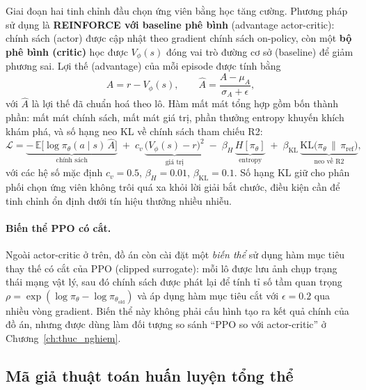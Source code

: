 \documentclass[../DoAn.tex]{subfiles}
\begin{document}
Giai đoạn hai tinh chỉnh đầu chọn ứng viên bằng học tăng cường. Phương pháp sử dụng là \textbf{REINFORCE với baseline phê bình} (advantage actor-critic): chính sách (actor) được cập nhật theo gradient chính sách on-policy, còn một \textbf{bộ phê bình (critic)} học được $V_\phi(s)$ đóng vai trò đường cơ sở (baseline) để giảm phương sai. Lợi thế (advantage) của mỗi episode được tính bằng
\begin{equation}
    A = r - V_\phi(s), \qquad \hat{A} = \frac{A - \mu_A}{\sigma_A + \epsilon},
    \label{eq:advantage}
\end{equation}
với $\hat{A}$ là lợi thế đã chuẩn hoá theo lô. Hàm mất mát tổng hợp gồm bốn thành phần: mất mát chính sách, mất mát giá trị, phần thưởng entropy khuyến khích khám phá, và số hạng neo KL về chính sách tham chiếu R2:
\begin{equation}
    \mathcal{L} = \underbrace{-\,\mathbb{E}\big[\log \pi_\theta(a\mid s)\,\hat{A}\big]}_{\text{chính sách}} \;+\; c_v\,\underbrace{\big(V_\phi(s) - r\big)^2}_{\text{giá trị}} \;-\; \beta_H\,\underbrace{H[\pi_\theta]}_{\text{entropy}} \;+\; \beta_{\text{KL}}\,\underbrace{\mathrm{KL}\big(\pi_\theta \,\|\, \pi_{\text{ref}}\big)}_{\text{neo về R2}},
    \label{eq:loss}
\end{equation}
với các hệ số mặc định $c_v=0.5$, $\beta_H=0.01$, $\beta_{\text{KL}}=0.1$. Số hạng KL giữ cho phân phối chọn ứng viên không trôi quá xa khỏi lời giải bắt chước, điều kiện cần để tinh chỉnh ổn định dưới tín hiệu thưởng nhiều nhiễu.

\paragraph{Biến thể PPO có cắt.} Ngoài actor-critic ở trên, đồ án còn cài đặt một \textit{biến thể} sử dụng hàm mục tiêu thay thế có cắt của PPO (clipped surrogate): mỗi lô được lưu ảnh chụp trạng thái mạng vật lý, sau đó chính sách được phát lại để tính tỉ số tầm quan trọng $\rho = \exp(\log\pi_\theta - \log\pi_{\theta_{\text{old}}})$ và áp dụng hàm mục tiêu cắt với $\epsilon=0.2$ qua nhiều vòng gradient. Biến thể này không phải cấu hình tạo ra kết quả chính của đồ án, nhưng được dùng làm đối tượng so sánh ``PPO so với actor-critic'' ở Chương~\ref{ch:thuc_nghiem}.

\subsection{Mã giả thuật toán huấn luyện tổng thể}
\label{subsec:train-algo}
\end{document}
